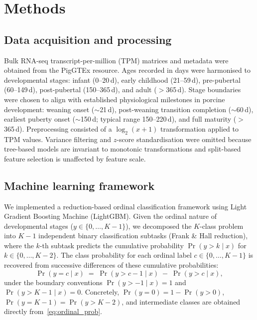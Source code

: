 \documentclass[10pt,a4paper]{article}
\begin{document}
\section{Methods}

\subsection{Data acquisition and processing}

Bulk RNA-seq transcript-per-million (TPM) matrices and metadata were obtained from the PigGTEx resource\cite{teng_compendium_2024,chen_construction_2025}. Ages recorded in days were harmonised to developmental stages: infant (0--20\,d), early childhood (21--59\,d), pre-pubertal (60--149\,d), post-pubertal (150--365\,d), and adult ($>$365\,d). Stage boundaries were chosen to align with established physiological milestones in porcine development\cite{swindle_swine_2012}: weaning onset ($\sim$21\,d)\cite{pluske_gastrointestinal_2018}, post-weaning transition completion ($\sim$60\,d)\cite{whittemore_whittemores_2006}, earliest puberty onset ($\sim$150\,d; typical range 150--220\,d)\cite{lents_physiological_2020}, and full maturity ($>$365\,d). Preprocessing consisted of a $\log_2(x+1)$ transformation applied to TPM values. Variance filtering and $z$-score standardisation were omitted because tree-based models are invariant to monotonic transformations and split-based feature selection is unaffected by feature scale.

\subsection{Machine learning framework}

We implemented a reduction-based ordinal classification framework using Light Gradient Boosting Machine (LightGBM)\cite{ke_lightgbm_2017}. Given the ordinal nature of developmental stages ($y \in \{0,\dots,K-1\}$), we decomposed the $K$-class problem into $K-1$ independent binary classification subtasks (Frank \& Hall reduction\cite{frank_simple_2001}), where the $k$-th subtask predicts the cumulative probability $\Pr(y > k \mid x)$ for $k \in \{0,\dots,K-2\}$. The class probability for each ordinal label $c \in \{0,\dots,K-1\}$ is recovered from successive differences of these cumulative probabilities:
\begin{equation}
\Pr(y = c \mid x) \;=\; \Pr(y > c-1 \mid x) \;-\; \Pr(y > c \mid x),
\label{eq:ordinal_prob}
\end{equation}
under the boundary conventions $\Pr(y > -1 \mid x) = 1$ and $\Pr(y > K-1 \mid x) = 0$. Concretely, $\Pr(y=0) = 1 - \Pr(y>0)$, $\Pr(y=K-1) = \Pr(y>K-2)$, and intermediate classes are obtained directly from~\eqref{eq:ordinal_prob}.
\end{document}
